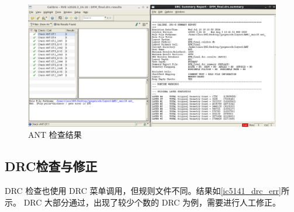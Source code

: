 \documentclass[12pt,hyperref,a4paper,UTF8]{ctexart}
\begin{document}
\begin{figure}[htbp]
    \centering
    \includegraphics[width =.7\textwidth]{figures/ANT_result.png}
    \caption{ANT 检查结果}
    \label{ic5141_ant}
\end{figure}

\subsection{DRC检查与修正}
DRC 检查也使用 DRC 菜单调用，但规则文件不同。结果如\autoref{ic5141_drc_err}所示。
DRC 大部分通过，出现了较少个数的 DRC 为例，需要进行人工修正。
\end{document}

